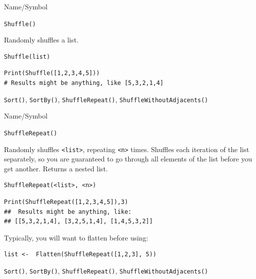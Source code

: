 \begin{desc}{Name/Symbol}
\item[Name/Symbol] 	\verb+Shuffle()+

\item[Description] 	Randomly shuffles a list.

\item[Usage]    
\begin{verbatim}
Shuffle(list)
\end{verbatim}

\item[Example]
\begin{verbatim}
Print(Shuffle([1,2,3,4,5]))
# Results might be anything, like [5,3,2,1,4]
\end{verbatim}

\item[See Also]    	\verb+Sort()+, \verb+SortBy()+, \verb+ShuffleRepeat()+,
                    \verb+ShuffleWithoutAdjacents()+
\end{desc}



\begin{desc}{Name/Symbol}
\item[Name/Symbol] 	\verb+ShuffleRepeat()+

\item[Description] 	Randomly shuffles  \verb+<list>+, repeating \verb+<n>+ times.  Shuffles  each iteration of the list separately, so you are guaranteed to go  through all elements of the list before you get another.  Returns a nested list.

\item[Usage]    
\begin{verbatim}
ShuffleRepeat(<list>, <n>)
\end{verbatim}


\item[Example]
\begin{verbatim}
Print(ShuffleRepeat([1,2,3,4,5]),3)
##  Results might be anything, like:
## [[5,3,2,1,4], [3,2,5,1,4], [1,4,5,3,2]]
\end{verbatim}

Typically, you will want to flatten before using:
\begin{verbatim}
list <-  Flatten(ShuffleRepeat([1,2,3], 5))
\end{verbatim}

\item[See Also]    	\verb+Sort()+, \verb+SortBy()+, \verb+ShuffleRepeat()+,
                    \verb+ShuffleWithoutAdjacents()+
\end{desc}


